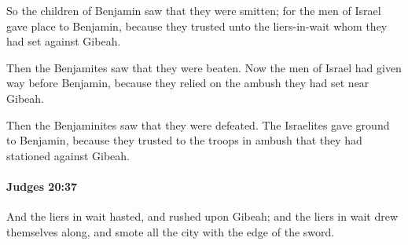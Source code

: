 			\begin{versebox}
					\item[BHS] 
					\item[ASV] So the children of Benjamin saw that they were smitten; for the men of Israel gave place to Benjamin, because they trusted unto the liers-in-wait whom they had set against Gibeah.
					\item[NIV] Then the Benjamites saw that they were beaten. Now the men of Israel had given way before Benjamin, because they relied on the ambush they had set near Gibeah.
					\item[NRSV] Then the Benjaminites saw that they were defeated. The Israelites gave ground to Benjamin, because they trusted to the troops in ambush that they had stationed against Gibeah.
			\end{versebox}

		\paragraph{Judges 20:37} %
			\label{JUDGES-20-37}

			And the liers in wait hasted, and rushed upon Gibeah; and the liers in wait drew themselves along, and smote all the city with the edge of the sword.

